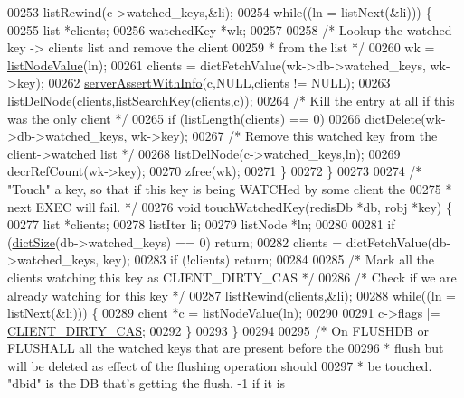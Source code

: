 \begin{DoxyCode}
00253     listRewind(c->watched\_keys,&li);
00254     \textcolor{keywordflow}{while}((ln = listNext(&li))) \{
00255         list *clients;
00256         watchedKey *wk;
00257 
00258         \textcolor{comment}{/* Lookup the watched key -> clients list and remove the client}
00259 \textcolor{comment}{         * from the list */}
00260         wk = \hyperlink{adlist_8h_af84cae230e7180ebcda1e2736fce9f65}{listNodeValue}(ln);
00261         clients = dictFetchValue(wk->db->watched\_keys, wk->key);
00262         \hyperlink{server_8h_a7308f76cbff9a8d3797fe78190b91282}{serverAssertWithInfo}(c,NULL,clients != NULL);
00263         listDelNode(clients,listSearchKey(clients,c));
00264         \textcolor{comment}{/* Kill the entry at all if this was the only client */}
00265         \textcolor{keywordflow}{if} (\hyperlink{adlist_8h_afde0ab079f934670e82119b43120e94b}{listLength}(clients) == 0)
00266             dictDelete(wk->db->watched\_keys, wk->key);
00267         \textcolor{comment}{/* Remove this watched key from the client->watched list */}
00268         listDelNode(c->watched\_keys,ln);
00269         decrRefCount(wk->key);
00270         zfree(wk);
00271     \}
00272 \}
00273 
00274 \textcolor{comment}{/* "Touch" a key, so that if this key is being WATCHed by some client the}
00275 \textcolor{comment}{ * next EXEC will fail. */}
00276 \textcolor{keywordtype}{void} touchWatchedKey(redisDb *db, robj *key) \{
00277     list *clients;
00278     listIter li;
00279     listNode *ln;
00280 
00281     \textcolor{keywordflow}{if} (\hyperlink{dict_8h_af193430dd3d5579a52b194512f72c1f0}{dictSize}(db->watched\_keys) == 0) \textcolor{keywordflow}{return};
00282     clients = dictFetchValue(db->watched\_keys, key);
00283     \textcolor{keywordflow}{if} (!clients) \textcolor{keywordflow}{return};
00284 
00285     \textcolor{comment}{/* Mark all the clients watching this key as CLIENT\_DIRTY\_CAS */}
00286     \textcolor{comment}{/* Check if we are already watching for this key */}
00287     listRewind(clients,&li);
00288     \textcolor{keywordflow}{while}((ln = listNext(&li))) \{
00289         \hyperlink{structclient}{client} *c = \hyperlink{adlist_8h_af84cae230e7180ebcda1e2736fce9f65}{listNodeValue}(ln);
00290 
00291         c->flags |= \hyperlink{server_8h_a0f4df645d72b6b3e9a0d07afbe502a51}{CLIENT\_DIRTY\_CAS};
00292     \}
00293 \}
00294 
00295 \textcolor{comment}{/* On FLUSHDB or FLUSHALL all the watched keys that are present before the}
00296 \textcolor{comment}{ * flush but will be deleted as effect of the flushing operation should}
00297 \textcolor{comment}{ * be touched. "dbid" is the DB that's getting the flush. -1 if it is}

\end{DoxyCode}

